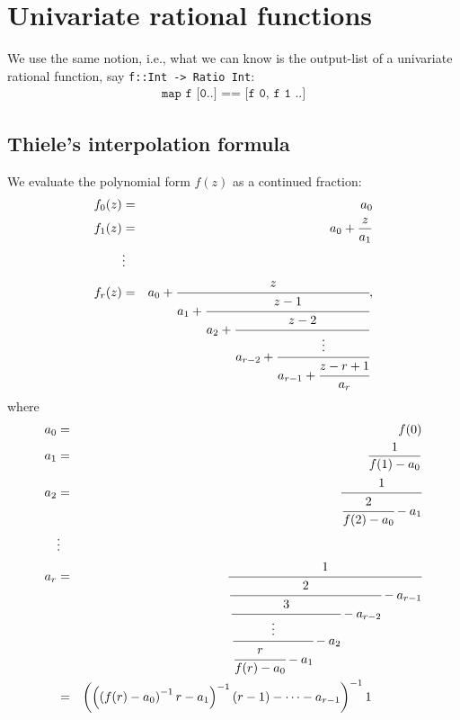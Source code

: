 \documentclass[11pt]{book}
\begin{document}
%
%
%

\section{Univariate rational functions}
We use the same notion, i.e., what we can know is the output-list of a univariate rational function, say \texttt{f::Int -> Ratio Int}:
\begin{eqnarray}
\texttt{map f [0..] == [f 0, f 1 ..]}
\end{eqnarray}

\subsection{Thiele's interpolation formula}
We evaluate the polynomial form $f(z)$ as a continued fraction:
\begin{eqnarray}
f_0(z) &=& a_0 \\
f_1(z) &=& a_0 + \frac{z}{a_1} \\
\nonumber
&\vdots& \\
f_r(z) &=& a_0 + \cfrac{z}{a_1 + \cfrac{z-1}{a_2 + \cfrac{z- 2}{a_{r-2} + \cfrac{\vdots}{a_{r-1} + \cfrac{z-r+1}{a_r}}}}},
\end{eqnarray}
where
\begin{eqnarray}
a_0 &=& f(0) \\
a_1 &=& \frac{1}{f(1) - a_0}\\
a_2 &=& \cfrac{1}{\cfrac{2}{f(2)-a_0} - a_1} \\
\nonumber
&\vdots& \\
a_r &=&\cfrac{1}{\cfrac{2}{\cfrac{3}{\cfrac{\vdots}{\cfrac{r}{f(r)-a_0}-a_1}-a_2} - a_{r-2}} - a_{r-1}} \\
&=& \left( \left( \left( f(r)-a_0 \right)^{-1} r - a_1 \right)^{-1} (r - 1) - \cdots - a_{r-1} \right)^{-1} 1 \qquad\qquad
\end{eqnarray}
\end{document}
